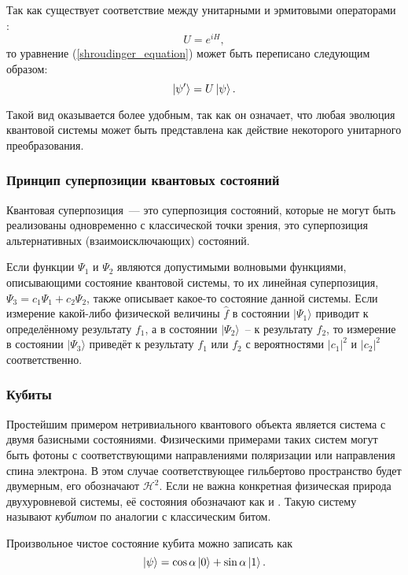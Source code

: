 Так как существует соответствие между унитарными и эрмитовыми операторами \cite{nielsen_chuang}:
\begin{equation} U = e^{iH}, \end{equation}
то уравнение (\ref{shroudinger_equation}) может быть переписано следующим образом:
\begin{equation} \left| \psi' \right\rangle = U \left| \psi \right\rangle.\end{equation}

Такой вид оказывается более удобным, так как он означает, что любая эволюция квантовой системы может быть представлена как действие некоторого унитарного преобразования.

\subsubsection{Принцип суперпозиции квантовых состояний}
Квантовая суперпозиция~--- это суперпозиция состояний, которые не могут быть реализованы одновременно с классической точки зрения, это суперпозиция альтернативных (взаимоисключающих) состояний.

Если функции  $\Psi_1$ и $\Psi_2$ являются допустимыми волновыми функциями, описывающими состояние квантовой системы, то их линейная суперпозиция, $\Psi_3 = c_1\Psi_1 + c_2\Psi_2$, также описывает какое-то состояние данной системы. 
Если измерение какой-либо физической величины  $\hat f$ в состоянии  $|\Psi_1\rangle$ приводит к определённому результату $f_1$, а в состоянии  $|\Psi_2\rangle$~-- к результату $f_2$, то измерение в состоянии $|\Psi_3\rangle$ приведёт к результату $f_1$ или $f_2$ с вероятностями $|c_1|^2$ и $ |c_2|^2$ соответственно.

\subsubsection{Кубиты}
Простейшим примером нетривиального квантового объекта является система с двумя базисными состояниями. 
Физическими примерами таких систем могут быть фотоны с соответствующими направлениями поляризации или направления спина электрона.
В этом случае соответствующее гильбертово пространство будет двумерным, его обозначают $\mathcal H^2$.
Если не важна конкретная физическая природа двухуровневой системы, её состояния обозначают как 
 и . Такую систему называют \textit{кубитом} по аналогии с классическим битом.

Произвольное чистое состояние кубита можно записать как
\begin{equation} \left| \psi \right\rangle = \cos \alpha \left| 0 \right\rangle + \sin \alpha \left| 1 \right\rangle. \end{equation}

